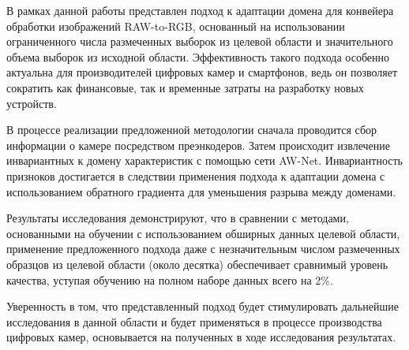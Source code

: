 
В рамках данной работы представлен подход к адаптации домена для конвейера обработки изображений RAW-to-RGB, основанный на использовании ограниченного числа размеченных выборок из целевой области и значительного объема выборок из исходной области. Эффективность такого подхода особенно актуальна для производителей цифровых камер и смартфонов, ведь он позволяет сократить как финансовые, так и временные затраты на разработку новых устройств.

В процессе реализации предложенной методологии сначала проводится сбор информации о камере посредством преэнкодеров. Затем происходит извлечение инвариантных к домену характеристик с помощью сети AW-Net. Инвариантность призноков достигается в следствии применения подхода к адаптации домена с использованием обратного градиента для уменьшения разрыва между доменами.

Результаты исследования демонстрируют, что в сравнении с методами, основанными на обучении с использованием обширных данных целевой области, применение предложенного подхода даже с незначительным числом размеченных образцов из целевой области (около десятка) обеспечивает сравнимый уровень качества, уступая обучению на полном наборе данных всего на 2\%.

Уверенность в том, что представленный подход будет стимулировать дальнейшие исследования в данной области и будет применяться в процессе производства цифровых камер, основывается на полученных в ходе исследования результатах.

\clearpage